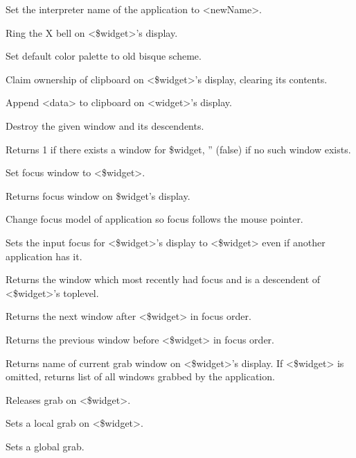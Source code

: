 \begin{enum}{1cm}

Set the interpreter name of the application to <newName>.

Ring the X bell on <\$widget>'s display.

Set default color palette to old bisque scheme.

Claim ownership of clipboard on <\$widget>'s display, clearing its contents.

Append <data> to clipboard on <widget>'s display.

Destroy the given window and its descendents.

Returns 1 if there exists a window for \$widget, '' (false) if no such window exists. 

Set focus window to <\$widget>.

Returns focus window on \$widget's display.

Change focus model of application so focus follows the mouse pointer.

Sets the input focus for <\$widget>'s display to <\$widget>
even if another application has it.

Returns the window which most recently had focus and is a descendent
of <\$widget>'s toplevel.

Returns the next window after <\$widget> in focus order.

Returns the previous window before <\$widget> in focus order.

Returns name of current grab window on <\$widget>'s display. If <\$widget> is
omitted, returns list of all windows grabbed by the application.

Releases grab on <\$widget>.

Sets a local grab on <\$widget>.

Sets a global grab.


\end{enum}
